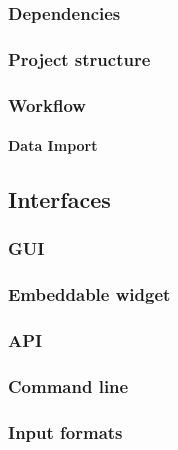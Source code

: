 \documentclass[
]{article}
\begin{document}
\hypertarget{dependencies}{%
\subsubsection{Dependencies}\label{dependencies}}

\hypertarget{project-structure}{%
\subsubsection{Project structure}\label{project-structure}}

\hypertarget{workflow}{%
\subsubsection{Workflow}\label{workflow}}

\hypertarget{data-import}{%
\paragraph{Data Import}\label{data-import}}

\hypertarget{interfaces}{%
\subsection{Interfaces}\label{interfaces}}

\hypertarget{gui}{%
\subsubsection{GUI}\label{gui}}

\hypertarget{embeddable-widget}{%
\subsubsection{Embeddable widget}\label{embeddable-widget}}

\hypertarget{api}{%
\subsubsection{API}\label{api}}

\hypertarget{command-line}{%
\subsubsection{Command line}\label{command-line}}

\hypertarget{input-formats}{%
\subsubsection{Input formats}\label{input-formats}}
\end{document}
